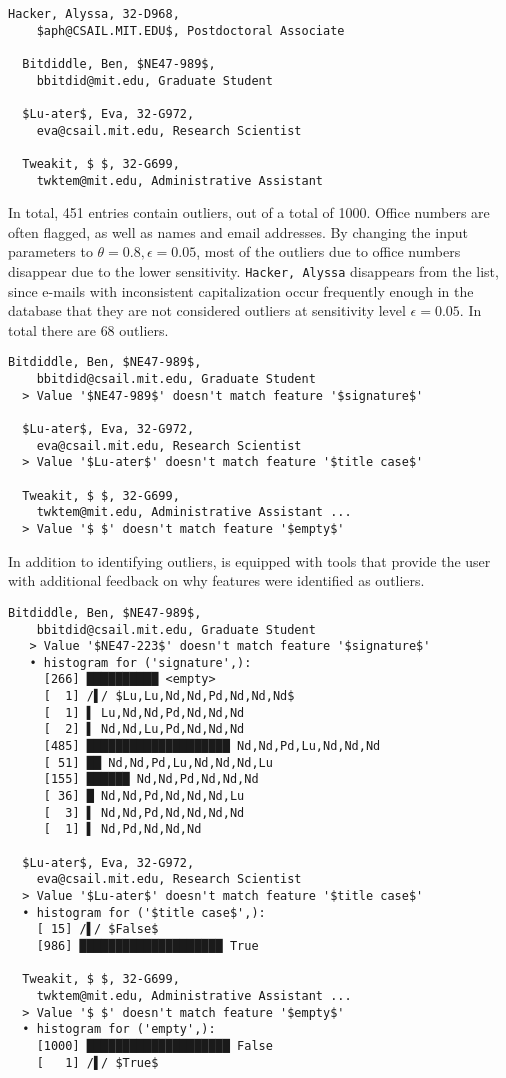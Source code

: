 \begin{lstlisting}[gobble=2]
  Hacker, Alyssa, 32-D968,
    $aph@CSAIL.MIT.EDU$, Postdoctoral Associate

  Bitdiddle, Ben, $NE47-989$,
    bbitdid@mit.edu, Graduate Student

  $Lu-ater$, Eva, 32-G972,
    eva@csail.mit.edu, Research Scientist

  Tweakit, $ $, 32-G699,
    twktem@mit.edu, Administrative Assistant
\end{lstlisting}

In total, 451 entries contain outliers, out of a total of 1000. Office numbers are often flagged, as well as names and email addresses. By changing the input parameters to $\theta = 0.8, \epsilon = 0.05$, most of the outliers due to office numbers disappear due to the lower sensitivity. \lstinline{Hacker, Alyssa} disappears from the list, since e-mails with inconsistent capitalization occur frequently enough in the database that they are not considered outliers at sensitivity level $\epsilon = 0.05$. In total there are $68$ outliers.

\begin{lstlisting}[gobble=2]
  Bitdiddle, Ben, $NE47-989$,
    bbitdid@csail.mit.edu, Graduate Student
  > Value '$NE47-989$' doesn't match feature '$signature$'

  $Lu-ater$, Eva, 32-G972,
    eva@csail.mit.edu, Research Scientist
  > Value '$Lu-ater$' doesn't match feature '$title case$'

  Tweakit, $ $, 32-G699,
    twktem@mit.edu, Administrative Assistant ...
  > Value '$ $' doesn't match feature '$empty$'
\end{lstlisting}

In addition to identifying outliers, \dBoost is equipped with tools that provide the user with additional feedback on why features were identified as outliers.

\begin{lstlisting}[gobble=2]
  Bitdiddle, Ben, $NE47-989$,
    bbitdid@csail.mit.edu, Graduate Student
   > Value '$NE47-223$' doesn't match feature '$signature$'
   • histogram for ('signature',):
     [266] ██████████ <empty>
     [  1] /▌/ $Lu,Lu,Nd,Nd,Pd,Nd,Nd,Nd$
     [  1] ▌ Lu,Nd,Nd,Pd,Nd,Nd,Nd
     [  2] ▌ Nd,Nd,Lu,Pd,Nd,Nd,Nd
     [485] ████████████████████ Nd,Nd,Pd,Lu,Nd,Nd,Nd
     [ 51] ██ Nd,Nd,Pd,Lu,Nd,Nd,Nd,Lu
     [155] ██████ Nd,Nd,Pd,Nd,Nd,Nd
     [ 36] █ Nd,Nd,Pd,Nd,Nd,Nd,Lu
     [  3] ▌ Nd,Nd,Pd,Nd,Nd,Nd,Nd
     [  1] ▌ Nd,Pd,Nd,Nd,Nd

  $Lu-ater$, Eva, 32-G972,
    eva@csail.mit.edu, Research Scientist
  > Value '$Lu-ater$' doesn't match feature '$title case$'
  • histogram for ('$title case$',):
    [ 15] /▌/ $False$
    [986] ████████████████████ True

  Tweakit, $ $, 32-G699,
    twktem@mit.edu, Administrative Assistant ...
  > Value '$ $' doesn't match feature '$empty$'
  • histogram for ('empty',):
    [1000] ████████████████████ False
    [   1] /▌/ $True$
\end{lstlisting}

